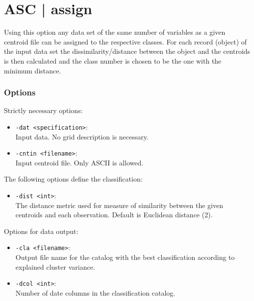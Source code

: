 \documentclass[12pt, oneside, a4paper, headsepline, plainheadsepline]{scrbook}
\begin{document}
\section{ASC | assign}
\label{asc}
Using this option any data set of the same number of variables as a given centroid file can be assigned 
to the respective classes. For each record (object) of the input data set the dissimilarity/distance between the object 
and the centroids is then calculated and the class number is chosen to be the one with the minimum distance.
%

\subsubsection*{Options}
Strictly necessary options:
\begin{itemize}
 \item \verb+-dat <specification>+:\\ Input data. No grid description is necessary.
 \item \verb+-cntin <filename>+:\\ Input centroid file. Only ASCII is allowed.
\end{itemize}
The following options define the classification:
\begin{itemize}
 \item \verb+-dist <int>+:\\ 
 The distance metric used for measure of similarity between the given centroids and each observation. Default is Euclidean distance (2). 
\end{itemize}
Options for data output:
\begin{itemize}
 \item \verb+-cla <filename>+:\\ Output file name for the catalog with the best classification according to explained cluster variance.
 \item \verb+-dcol <int>+:\\ Number of date columns in the classification catalog.
\end{itemize}
\end{document}
